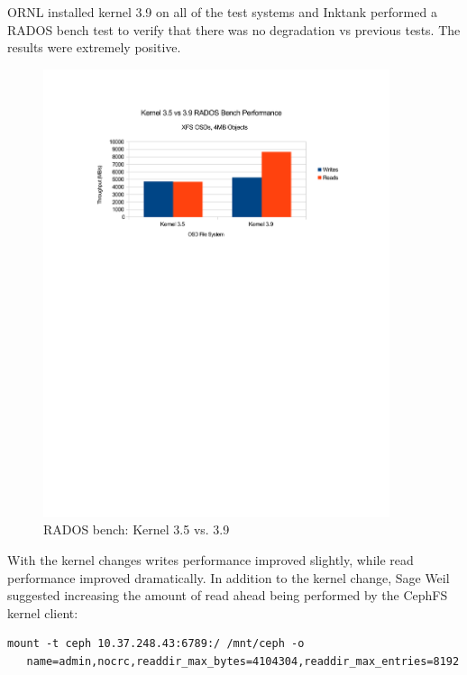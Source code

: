\documentclass{article}
\begin{document}
ORNL installed kernel 3.9 on all of the test systems and Inktank performed a
RADOS bench test to verify that there was no degradation vs previous tests.  The
results were extremely positive.


\begin{figure}[htb]
\centering
\includegraphics[width=4in]{rados-kernel-35vs39}
\caption{RADOS bench: Kernel 3.5 vs. 3.9}
\label{fig:rados-kernel}
\end{figure}



With the kernel changes writes performance improved slightly, while read
performance improved dramatically.  In addition to the kernel change, Sage Weil
suggested increasing the amount of read ahead being performed by the CephFS
kernel client:

\begin{Verbatim}[samepage=true]
mount -t ceph 10.37.248.43:6789:/ /mnt/ceph -o
   name=admin,nocrc,readdir_max_bytes=4104304,readdir_max_entries=8192
\end{Verbatim}
\end{document}
